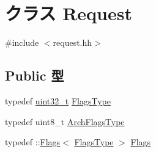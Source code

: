 \hypertarget{classRequest}{
\section{クラス Request}
\label{classRequest}
}


{\ttfamily \#include $<$request.hh$>$}\subsection*{Public 型}
\begin{DoxyCompactItemize}
\item 
typedef \hyperlink{Type_8hh_a435d1572bf3f880d55459d9805097f62}{uint32\_\-t} \hyperlink{classRequest_a2da503161d95c65aea559dbabcf570aa}{FlagsType}
\item 
typedef uint8\_\-t \hyperlink{classRequest_a50db53f1e2a3c758ce63d2a6046d8888}{ArchFlagsType}
\item 
typedef ::\hyperlink{classFlags}{Flags}$<$ \hyperlink{classRequest_a2da503161d95c65aea559dbabcf570aa}{FlagsType} $>$ \hyperlink{classRequest_ad6cda6b0b8d7ddfbf8e769082577b482}{Flags}
\end{DoxyCompactItemize}
